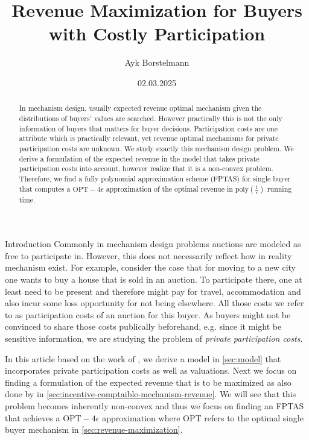 \documentclass[11pt,a4paper]{article}
\author{Ayk Borstelmann}
\title{Revenue Maximization for Buyers with Costly Participation}
\date{02.03.2025}
\newcommand{\1}[1]{\mbox{\rm\bf 1}_{#1}}
\begin{document}
\maketitle

\begin{abstract}
    In mechanism design, usually expected revenue optimal mechanism given the distributions of buyers' values are searched.
    However practically this is not the only information of buyers that matters for buyer decisions.
    Participation costs are one attribute which is practically relevant, yet revenue optimal mechanisms for private participation costs are unknown.
    We study exactly this mechanism design problem.
    We derive a formulation of the expected revenue in the model that takes private participation costs into account, however realize that it is a non-convex problem.
    Therefore, we find a fully polynomial approximation scheme (FPTAS) for single buyer that computes a $\mathrm{OPT} - 4\epsilon$ approximation of the optimal revenue in $\mathrm{poly}\left(\frac{1}{\epsilon}\right)$ running time.
\end{abstract}

\begin{section}{Introduction}
 Commonly in mechanism design problems auctions are modeled as free to participate in.
 However, this does not necessarily reflect how in reality mechanism exist.
 For example, consider the case that for moving to a new city one wants to buy a house that is sold in an auction.
 To participate there, one at least need to be present and therefore might pay for travel, accommodation and also incur some loss opportunity for not being elsewhere.
 All those costs we refer to as participation costs of an auction for this buyer.
 As buyers might not be convinced to share those costs publically beforehand, e.g. since it might be sensitive information, we are studying the problem of \textit{private participation costs}.

 In this article based on the work of \citet{primary}, we derive a model in \cref{sec:model} that incorporates private participation costs as well as valuations.
 Next we focus on finding a formulation of the expected revenue that is to be maximized as also done by \citet{myerson} in \cref{sec:incentive-comptaible-mechanism-revenue}.
 We will see that this problem becomes inherently non-convex and thus we focus on finding an FPTAS that achieves a $\mathrm{OPT} - 4\epsilon$ approximation where $\mathrm{OPT}$ refers to the optimal single buyer mechanism in \cref{sec:revenue-maximization}.
\end{section}
\end{document}
